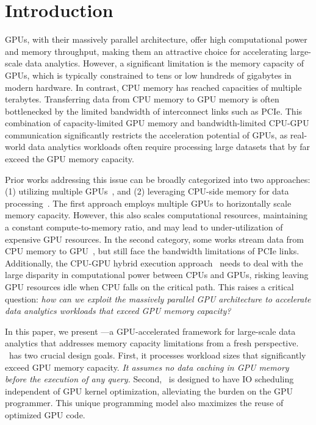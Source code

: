 \section{Introduction}

GPUs, with their massively parallel architecture, offer high computational power and memory throughput, making them an attractive choice for accelerating large-scale data analytics. 
However, a significant limitation is the memory capacity of GPUs, which is typically constrained to tens or low hundreds of gigabytes in modern hardware. 
In contrast, CPU memory has reached capacities of multiple terabytes. 
Transferring data from CPU memory to GPU memory is often bottlenecked by the limited bandwidth of interconnect links such as PCIe. 
This combination of capacity-limited GPU memory and bandwidth-limited CPU-GPU communication significantly restricts the acceleration potential of GPUs, as real-world data analytics workloads often require processing large datasets that by far exceed the GPU memory capacity.

Prior works addressing this issue can be broadly categorized into two approaches: (1) utilizing multiple GPUs~\cite{heavyai, mg-join-sigmod-2021, multi-gpu-sort-sigmod-2022}, and (2) leveraging CPU-side memory for data processing~\cite{hetexchange-vldb-2019, HERO-VLDB-2017, GDB-TDBSys-2009, mordered-vldb-2022, Ocelot-VLDB-2014, Ocelet-VLDB-2013}. 
The first approach employs multiple GPUs to horizontally scale memory capacity. 
However, this also scales computational resources, maintaining a constant compute-to-memory ratio, and may lead to under-utilization of expensive GPU resources. 
In the second category, some works stream data from CPU memory to GPU~\cite{hetexchange-vldb-2019, HERO-VLDB-2017, GDB-TDBSys-2009}, but still face the bandwidth limitations of PCIe links. 
Additionally, the CPU-GPU hybrid execution approach~\cite{mordered-vldb-2022, Ocelot-VLDB-2014, Ocelet-VLDB-2013} needs to deal with the large disparity in computational power between CPUs and GPUs, risking leaving GPU resources idle when CPU falls on the critical path.
This raises a critical question: \textit{how can we exploit the massively parallel GPU architecture to accelerate data analytics workloads that exceed GPU memory capacity?}

In this paper, we present \THISWORK—a GPU-accelerated framework for large-scale data analytics that addresses memory capacity limitations from a fresh perspective. 
\THISWORK\ has two crucial design goals. 
First, it processes workload sizes that significantly exceed GPU memory capacity. 
\textit{It assumes no data caching in GPU memory before the execution of any query.}
Second, \THISWORK\ is designed to have IO scheduling independent of GPU kernel optimization, alleviating the burden on the GPU programmer.
This unique programming model also maximizes the reuse of optimized GPU code.

